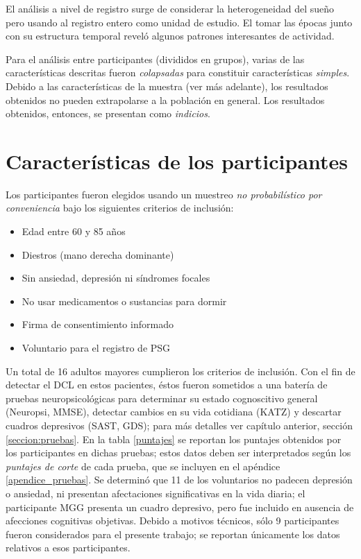 El análisis a nivel de registro surge de considerar la heterogeneidad del sueño pero usando al registro entero como unidad de estudio.
%
El tomar las épocas junto con su estructura temporal reveló algunos patrones interesantes de actividad.

Para el análisis entre participantes (divididos en grupos), varias de las características descritas fueron \textit{colapsadas} para constituir características \textit{simples}. 
%
Debido a las características de la muestra (ver más adelante), los resultados obtenidos no pueden extrapolarse a la población en general.
%
Los resultados obtenidos, entonces, se presentan como \textit{indicios}.


\section{Características de los participantes}

Los participantes fueron elegidos usando un muestreo \textit{no probabilístico por conveniencia} bajo los siguientes criterios de inclusión:
\begin{itemize}
\item Edad entre 60 y 85 años
\item Diestros (mano derecha dominante)
\item Sin ansiedad, depresión ni síndromes focales
\item No usar medicamentos o sustancias para dormir
\item Firma de consentimiento informado
\item Voluntario para el registro de PSG
\end{itemize}

Un total de 16 adultos mayores cumplieron los criterios de inclusión. 
%
Con el fin de detectar el DCL en estos pacientes, éstos fueron sometidos a una batería de pruebas neuropsicológicas para determinar su estado cognoscitivo general (Neuropsi, MMSE), detectar cambios en su vida cotidiana (KATZ) y descartar cuadros depresivos (SAST, GDS); para más detalles ver capítulo anterior, sección \ref{seccion:pruebas}.
%
En la tabla \ref{puntajes} se reportan los puntajes obtenidos por los participantes en dichas pruebas; estos datos deben ser interpretados según los \textit{puntajes de corte} de cada prueba, que se incluyen en el apéndice \ref{apendice_pruebas}.
%
Se determinó que 11 de los voluntarios no padecen depresión o ansiedad, ni presentan afectaciones significativas en la vida diaria; el participante MGG presenta un cuadro depresivo, pero fue incluido en ausencia de afecciones cognitivas objetivas.
%
Debido a motivos técnicos, sólo 9 participantes fueron considerados para el presente trabajo; se reportan únicamente los datos relativos a esos participantes.


